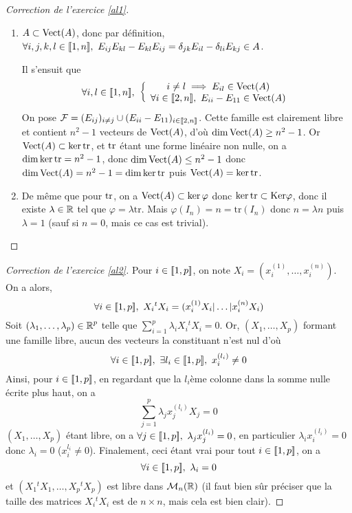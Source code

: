 \begin{proof}[Correction de l'exercice \ref{al1}]\hfill
    \begin{enumerate}
        \item $A\subset \operatorname{Vect}(A)$, donc par définition, 
        $\forall i,j,k,l\in\inl{1}{n},\ E_{ij}E_{kl}-E_{kl}E_{ij}=\delta_{jk}E_{il}-\delta_{li}E_{kj}\in A$. 
    
        Il s'ensuit que
        \[
            \forall i,l\in\inl1n,\ 
            \left\lbrace\begin{array}c i\neq l\implies E_{il}\in \Vect(A)\\
                 \forall i\in\inl{2}{n},\ E_{ii}-E_{11}\in \Vect(A)\end{array}\right. 
        \]
        On pose $\mathcal F=(E_{ij})_{i\neq j}\cup(E_{ii}-E_{11})_{i\in[\![2,n]\!]}$.
        Cette famille est clairement libre et contient $n^2-1$ vecteurs de $\operatorname{Vect}(A)$,
        d'où $\dim\operatorname{Vect}(A)\geq n^2-1$. 
        Or $\operatorname{Vect}(A)\subset \operatorname{ker}\operatorname{tr}$, et $\operatorname{tr}$ étant une forme linéaire non nulle,
        on a $\dim\operatorname{ker}\operatorname{tr}=n^2-1$, donc $\dim\operatorname{Vect}(A)\leq n^2-1$ 
        donc $\dim\operatorname{Vect}(A)=n^2-1=\dim\operatorname{ker}\operatorname{tr}$ puis $\operatorname{Vect}(A)=\operatorname{ker}\operatorname{tr}$.
        \item De même que pour $\operatorname{tr}$, on a $\operatorname{Vect}(A)\subset \operatorname{ker}\varphi$
        donc $\operatorname{ker}\operatorname{tr}\subset \text{Ker}\varphi$, donc il existe $\lambda\in\operatorname{\mathbb R}$
        tel que $\varphi=\lambda\text{tr}$. Mais $\varphi(I_n)=n=\text{tr}(I_n)$
        donc $n=\lambda n$ puis $\lambda = 1$ (sauf si $n=0$, mais ce cas est trivial).
    \end{enumerate}
\end{proof}

\begin{proof}[Correction de l'exercice \ref{al2}]
    Pour $i\in[\![1,p]\!]$, on note $X_i=(x_i^{(1)},\dots,x_i^{(n)})$. On a alors, \[\forall i\in\inl1p,\ X_i{}^tX_i=(x_i^{(1)}X_i|\dots|x_i^{(n)}X_i)\]
    Soit $(\lambda_1,\dots,\lambda_p)\in\operatorname{\mathbb R}^p$ telle que $\sum_{i=1}^p\lambda_iX_i{}^tX_i=0$.
    Or, $(X_1,\dots,X_p)$ formant une famille libre, aucun des vecteurs la constituant n'est nul d'où
    \[\forall i\in[\![1,p]\!],\ \exists l_i\in[\![1,p]\!],\ x_i^{(l_i)}\neq 0\]
    Ainsi, pour $i\in[\![1,p]\!]$, en regardant que la $l_i$ème colonne dans la somme nulle écrite plus haut, 
    on a \[\sum_{j=1}^p\lambda_jx_j^{(l_i)}X_j=0\]
    $(X_1,\dots,X_p)$ étant libre, on a $\forall j\in\inl1p,\ \lambda_jx_j^{(l_i)}=0$, en particulier $\lambda_ix_i^{(l_i)}=0$
    donc $\lambda_i=0$ ($x_i^{l_i}\neq 0$). 
    Finalement, ceci étant vrai pour tout $i\in[\![1,p]\!]$, on a 
    \[\forall i\in[\![1,p]\!],\ \lambda_i=0\] et $(X_1{}^tX_1,\dots,X_p{}^tX_p)$ est libre dans $\mathcal M_n(\operatorname{\mathbb R})$
    (il faut bien sûr préciser que la taille des matrices $X_i{}^tX_i$ est de $n\times n$, mais cela est bien clair).
\end{proof}